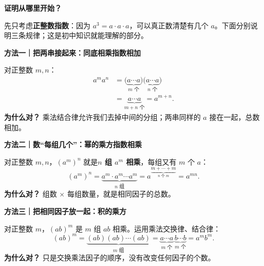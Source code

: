 \begin{proofbox}
    \textbf{\textcolor{CProof}{证明从哪里开始？}}\par
    先只考虑\textbf{正整数指数}：因为 $a^3=a\cdot a\cdot a$，可以真正数清楚有几个 $a$。下面分别说明三条规律；这是初中知识就能理解的部分。

    \medskip
    \textbf{\textcolor{CProof}{方法一｜把两串接起来：同底相乘指数相加}}\par
    对正整数 $m,n$：
    \[
      \begin{aligned}
        a^ma^n
        &=\bigl(\underbrace{a\cdots a}_{m\text{ 个}}\bigr)
          \bigl(\underbrace{a\cdots a}_{n\text{ 个}}\bigr)\\
        &=\underbrace{a\cdots a}_{m+n\text{ 个}}=a^{m+n}.
      \end{aligned}
    \]
    \textbf{为什么对？} 乘法结合律允许我们去掉中间的分组；两串同样的 $a$ 接在一起，总数相加。
    \begin{center}
    
    \end{center}

    \medskip
    \textbf{\textcolor{CProof}{方法二｜数“每组几个”：幂的乘方指数相乘}}\par
    对正整数 $m,n$，$(a^m)^n$ 就是\textbf{$n$ 组 $a^m$ 相乘}，每组又有 $m$ 个 $a$：
    \[
      (a^m)^n=\underbrace{a^m\cdot a^m\cdots a^m}_{n\text{ 组}}
      =a^{\underbrace{m+\cdots+m}_{n\text{ 个 }m}}=a^{mn}.
    \]
    \textbf{为什么对？} 组数 $\times$ 每组数量，就是相同因子的总数。
    \begin{center}
    
    \end{center}

    \medskip
    \textbf{\textcolor{CProof}{方法三｜把相同因子放一起：积的乘方}}\par
    对正整数 $m$，$(ab)^m$ 是 $m$ 组 $ab$ 相乘。运用乘法交换律、结合律：
    \[
      (ab)^m=\underbrace{(ab)(ab)\cdots(ab)}_{m\text{ 组}}
        =\underbrace{a\cdots a}_{m\text{ 个}}\,
         \underbrace{b\cdots b}_{m\text{ 个}}=a^mb^m.
    \]
    \textbf{为什么对？} 只是交换乘法因子的顺序，没有改变任何因子的个数。
    \begin{center}
    
    \end{center}


\end{proofbox}
